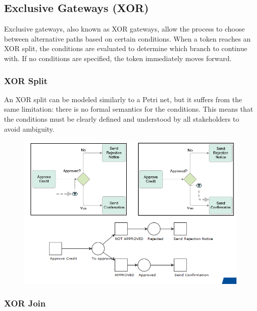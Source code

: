 \subsection{Exclusive Gateways (XOR)}

Exclusive gateways, also known as XOR gateways, allow the process to choose between alternative paths based on certain conditions. When a token reaches an XOR split, the conditions are evaluated to determine which branch to continue with. If no conditions are specified, the token immediately moves forward.

\subsubsection{XOR Split}

An XOR split can be modeled similarly to a Petri net, but it suffers from the same limitation: there is no formal semantics for the conditions. This means that the conditions must be clearly defined and understood by all stakeholders to avoid ambiguity.
\begin{figure}[h!]
    \centering
    \includegraphics[width=0.75\linewidth]{capitolo 9/3.png}
\end{figure}

\subsubsection{XOR Join}

